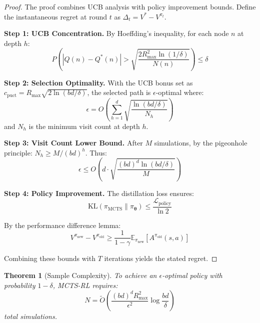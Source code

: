 \documentclass[11pt,a4paper]{article}
\newtheorem{theorem}{Theorem}[section]
\newcommand{\E}{\mathbb{E}}
\newcommand{\KL}{\text{KL}}
\newcommand{\calL}{\mathcal{L}}
\newcommand{\btheta}{\bm{\theta}}
\begin{document}
\begin{proof}
The proof combines UCB analysis with policy improvement bounds. Define the instantaneous regret at round $t$ as $\Delta_t = V^* - V^{\pi_t}$.

\textbf{Step 1: UCB Concentration.} By Hoeffding's inequality, for each node $n$ at depth $h$:
\begin{equation}
    P\left(|Q(n) - Q^*(n)| > \sqrt{\frac{2R_{\max}^2 \ln(1/\delta)}{N(n)}}\right) \leq \delta
\end{equation}

\textbf{Step 2: Selection Optimality.} With the UCB bonus set as $c_{\text{puct}} = R_{\max}\sqrt{2\ln(bd/\delta)}$, the selected path is $\epsilon$-optimal where:
\begin{equation}
    \epsilon = O\left(\sum_{h=1}^d \sqrt{\frac{\ln(bd/\delta)}{N_h}}\right)
\end{equation}
and $N_h$ is the minimum visit count at depth $h$.

\textbf{Step 3: Visit Count Lower Bound.} After $M$ simulations, by the pigeonhole principle: $N_h \geq M/(bd)^h$. Thus:
\begin{equation}
    \epsilon \leq O\left(d \cdot \sqrt{\frac{(bd)^d \ln(bd/\delta)}{M}}\right)
\end{equation}

\textbf{Step 4: Policy Improvement.} The distillation loss ensures:
\begin{equation}
    \KL(\pi_{\text{MCTS}} \| \pi_\btheta) \leq \frac{\calL_{\text{policy}}}{\ln 2}
\end{equation}

By the performance difference lemma:
\begin{equation}
    V^{\pi_{\text{new}}} - V^{\pi_{\text{old}}} \geq \frac{1}{1-\gamma}\E_{\pi_{\text{new}}}[A^{\pi_{\text{old}}}(s,a)]
\end{equation}

Combining these bounds with $T$ iterations yields the stated regret.
\end{proof}

\begin{theorem}[Sample Complexity]
\label{thm:mcts_sample}
To achieve an $\epsilon$-optimal policy with probability $1-\delta$, MCTS-RL requires:
\begin{equation}
    N = \tilde{O}\left(\frac{(bd)^d R_{\max}^2}{\epsilon^2} \log\frac{bd}{\delta}\right)
\end{equation}
total simulations.
\end{theorem}
\end{document}
